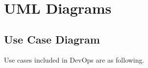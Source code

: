 \documentclass[a4paper,oneside,1,english1pt]{report}
\begin{document}
\section{UML Diagrams}
\subsection{Use Case Diagram}

Use cases included in DevOps are as following.

\end{document}
